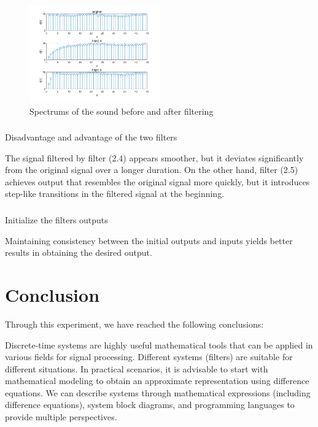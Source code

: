 \documentclass[journal]{IEEEtran}
\begin{document}
\begin{figure}[H]
   \centering
   \includegraphics[width=0.5\textwidth]{2.8.png} %
   \caption{Spectrums of the sound before and after filtering}
   \label{fig:2.8}
\end{figure}
\subsubsection{}Disadvantage and advantage of the two filters



The signal filtered by filter (2.4) appears smoother, but it deviates significantly from the original signal over a longer duration. On the other hand, filter (2.5) achieves output that resembles the original signal more quickly, but it introduces step-like transitions  in the filtered signal at the beginning.

\subsubsection{}Initialize the filters outputs

Maintaining consistency between the initial outputs and inputs yields better results in obtaining the desired output.

\section{Conclusion}

Through this experiment, we have reached the following conclusions: 

Discrete-time systems are highly useful mathematical tools that can be applied in various fields for signal processing. Different systems (filters) are suitable for different situations. In practical scenarios, it is advisable to start with mathematical modeling to obtain an approximate representation using difference equations. We can describe systems through mathematical expressions (including difference equations), system block diagrams, and programming languages to provide multiple perspectives.
\end{document}
